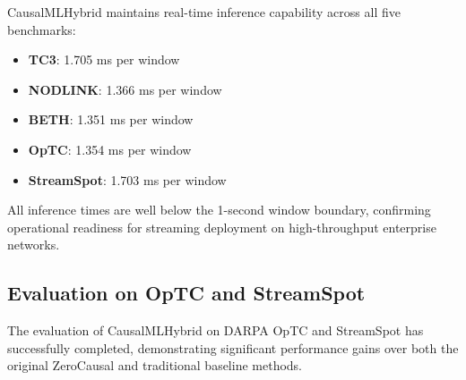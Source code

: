 CausalMLHybrid maintains real-time inference capability across all five benchmarks:
\begin{itemize}
\item \textbf{TC3}: 1.705 ms per window
\item \textbf{NODLINK}: 1.366 ms per window
\item \textbf{BETH}: 1.351 ms per window
\item \textbf{OpTC}: 1.354 ms per window
\item \textbf{StreamSpot}: 1.703 ms per window
\end{itemize}

All inference times are well below the 1-second window boundary, confirming operational readiness for streaming deployment on high-throughput enterprise networks.

\subsection{Evaluation on OpTC and StreamSpot}
\label{sec:optc_streamspot_v2}

The evaluation of CausalMLHybrid on DARPA OpTC and StreamSpot has successfully completed, demonstrating significant performance gains over both the original ZeroCausal and traditional baseline methods.


